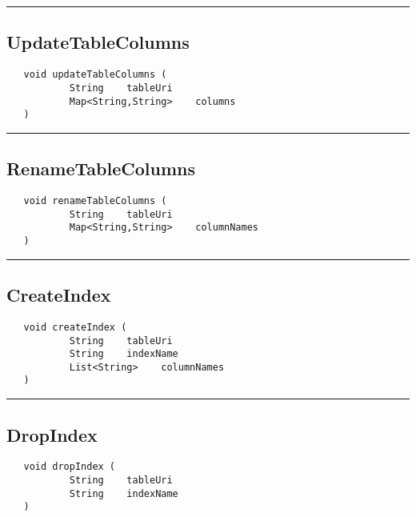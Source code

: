 \rule{15cm}{2pt}
\subsection{UpdateTableColumns}
\label{Api:UpdateTableColumns}
\begin{verbatim}
   void updateTableColumns (
           String    tableUri
           Map<String,String>    columns
   )
\end{verbatim}



\rule{15cm}{2pt}
\subsection{RenameTableColumns}
\label{Api:RenameTableColumns}
\begin{verbatim}
   void renameTableColumns (
           String    tableUri
           Map<String,String>    columnNames
   )
\end{verbatim}



\rule{15cm}{2pt}
\subsection{CreateIndex}
\label{Api:CreateIndex}
\begin{verbatim}
   void createIndex (
           String    tableUri
           String    indexName
           List<String>    columnNames
   )
\end{verbatim}



\rule{15cm}{2pt}
\subsection{DropIndex}
\label{Api:DropIndex}
\begin{verbatim}
   void dropIndex (
           String    tableUri
           String    indexName
   )
\end{verbatim}



